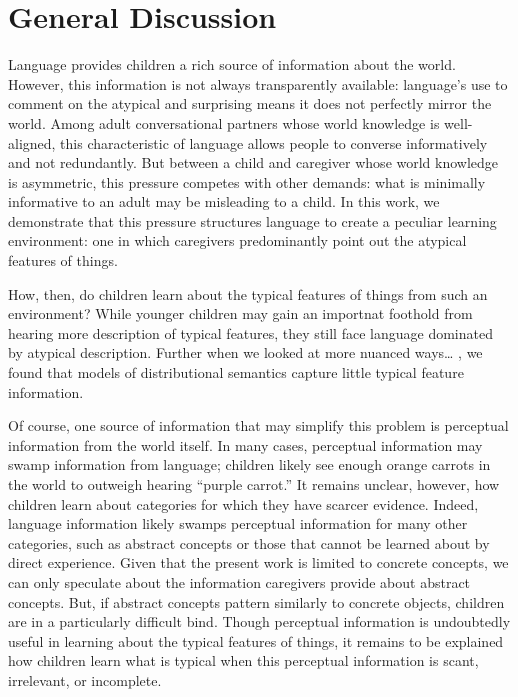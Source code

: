 \documentclass[10pt, letterpaper]{article}
\begin{document}
\hypertarget{general-discussion}{%
\section{General Discussion}\label{general-discussion}}

Language provides children a rich source of information about the world.
However, this information is not always transparently available:
language's use to comment on the atypical and surprising means it does
not perfectly mirror the world. Among adult conversational partners
whose world knowledge is well-aligned, this characteristic of language
allows people to converse informatively and not redundantly. But between
a child and caregiver whose world knowledge is asymmetric, this pressure
competes with other demands: what is minimally informative to an adult
may be misleading to a child. In this work, we demonstrate that this
pressure structures language to create a peculiar learning environment:
one in which caregivers predominantly point out the atypical features of
things.

How, then, do children learn about the typical features of things from
such an environment? While younger children may gain an importnat
foothold from hearing more description of typical features, they still
face language dominated by atypical description. Further when we looked
at more nuanced ways\ldots{} , we found that models of distributional
semantics capture little typical feature information.

Of course, one source of information that may simplify this problem is
perceptual information from the world itself. In many cases, perceptual
information may swamp information from language; children likely see
enough orange carrots in the world to outweigh hearing ``purple
carrot.'' It remains unclear, however, how children learn about
categories for which they have scarcer evidence. Indeed, language
information likely swamps perceptual information for many other
categories, such as abstract concepts or those that cannot be learned
about by direct experience. Given that the present work is limited to
concrete concepts, we can only speculate about the information
caregivers provide about abstract concepts. But, if abstract concepts
pattern similarly to concrete objects, children are in a particularly
difficult bind. Though perceptual information is undoubtedly useful in
learning about the typical features of things, it remains to be
explained how children learn what is typical when this perceptual
information is scant, irrelevant, or incomplete.
\end{document}
